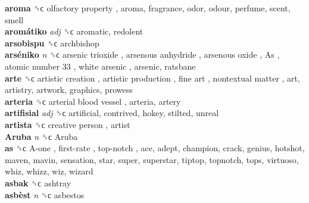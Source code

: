 \textbf{aroma} ␝ϲ   olfactory property , aroma, fragrance, odor, odour, perfume, scent, smell  \\
\textbf{aromátiko} \emph{adj}  ␝ϲ  aromatic, redolent  \\
\textbf{arsobispu} ␝ϲ  archbishop  \\
\textbf{arséniko} \emph{n}  ␝ϲ   arsenic trioxide ,  arsenous anhydride ,  arsenous oxide ,  As ,  atomic number 33 ,  white arsenic , arsenic, ratsbane  \\
\textbf{arte} ␝ϲ   artistic creation ,  artistic production ,  fine art ,  nontextual matter , art, artistry, artwork, graphics, prowess  \\
\textbf{arteria} ␝ϲ   arterial blood vessel , arteria, artery  \\
\textbf{artifisial} \emph{adj}  ␝ϲ  artificial, contrived, hokey, stilted, unreal  \\
\textbf{artista} ␝ϲ   creative person , artist  \\
\textbf{Aruba} \emph{n}  ␝ϲ   Aruba   \\
\textbf{as} ␝ϲ   A-one ,  first-rate ,  top-notch , ace, adept, champion, crack, genius, hotshot, maven, mavin, sensation, star, super, superstar, tiptop, topnotch, tops, virtuoso, whiz, whizz, wiz, wizard  \\
\textbf{asbak} ␝ϲ  ashtray  \\
\textbf{asbèst} \emph{n}  ␝ϲ  asbestos  \\
